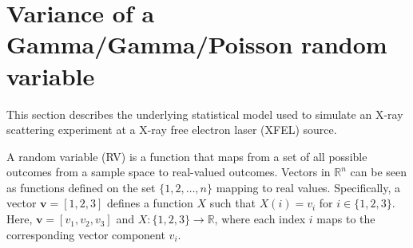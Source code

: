 \documentclass[11pt]{article}
\theoremstyle{definition}
\begin{document}
\section{Variance of a Gamma/Gamma/Poisson random variable}
This section describes the underlying statistical model used to simulate an X-ray scattering experiment at a X-ray free electron laser (XFEL) source. 

A random variable (RV) is a function that maps from a set of all possible outcomes from a sample space to real-valued outcomes. Vectors in \(\mathbb{R}^n\) can be seen as functions defined on the set \(\{1, 2, \ldots, n\}\) mapping to real values. Specifically, a vector \(\mathbf{v} = [1, 2, 3]\) defines a function \(X\) such that \(X(i) = v_i\) for \(i \in \{1, 2, 3\}\). Here, \(\mathbf{v} = [v_1, v_2, v_3]\) and \(X: \{1, 2, 3\} \rightarrow \mathbb{R}\), where each index \(i\) maps to the corresponding vector component \(v_i\).
\end{document}
